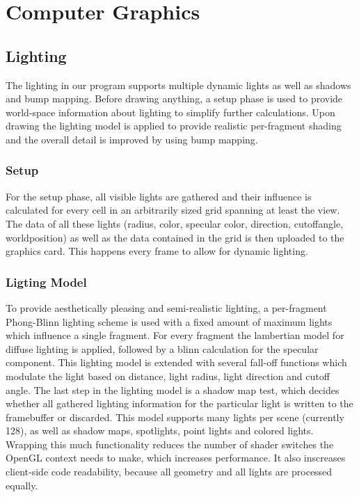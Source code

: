 \chapter{Computer Graphics}

\section{Lighting}
The lighting in our program supports multiple dynamic lights as well as shadows and bump mapping.  Before drawing anything, a setup phase is used to provide world-space information about lighting to simplify further calculations. Upon drawing the lighting model is applied to provide realistic per-fragment shading and the overall detail is improved by using bump mapping.
\subsection{Setup}
For the setup phase, all visible lights are gathered and their influence is calculated for every cell in an arbitrarily sized grid spanning at least the view. The data of all these lights (radius, color, specular color, direction, cutoffangle, worldposition) as well as the data contained in the grid is then uploaded to the graphics card. This happens every frame to allow for dynamic lighting.  
\subsection{Ligting Model}
To provide aesthetically pleasing and semi-realistic lighting, a per-fragment Phong-Blinn lighting scheme is used with a fixed amount of maximum lights which influence a single fragment. For every fragment the lambertian model for diffuse lighting is applied, followed by a blinn calculation for the specular component. This lighting model is extended with several fall-off functions which modulate the light based on distance, light radius, light direction and cutoff angle. The last step in the lighting model is a shadow map test, which decides whether all gathered lighting information for the particular light is written to the framebuffer or discarded. This model supports many lights per scene (currently 128), as well as shadow maps, spotlights, point lights and colored lights. Wrapping this much functionality reduces the number of shader switches the OpenGL context needs to make, which increases performance. It also inscreases client-side code readability, because all geometry and all lights are processed equally.
